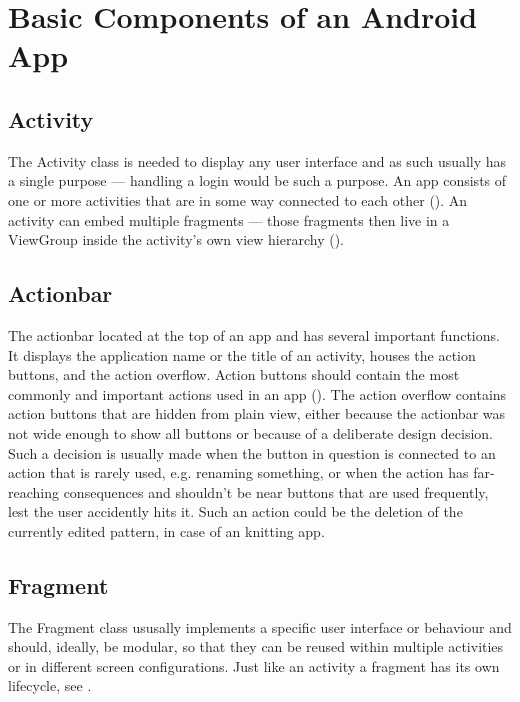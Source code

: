 \section{Basic Components of an Android App}

\subsection{Activity}
The Activity class is needed to display any user interface and as such usually has a single purpose --- handling a login would be such a purpose. An app consists of one or more activities that are in some way connected to each other (\cite{activities_in_app}). An activity can embed multiple fragments --- those fragments then live in a ViewGroup inside the activity's own view hierarchy (\cite{androidfragment}).  

\subsection{Actionbar}
The actionbar located at the top of an app and has several important functions. It displays the application name or the title of an activity, houses the action buttons, and the action overflow. Action buttons should contain the most commonly and important actions used in an app (\cite{actionbar}). The action overflow contains action buttons that are hidden from plain view, either because the actionbar was not wide enough to show all buttons or because of a deliberate design decision. Such a decision is usually made when the button in question is connected to an action that is rarely used, e.g. renaming something, or when the action has far-reaching consequences and shouldn't be near buttons that are used frequently, lest the user accidently hits it. Such an action could be the deletion of the currently edited pattern, in case of an knitting app. 

\subsection{Fragment}
The Fragment class ususally implements a specific user interface or behaviour and should, ideally, be modular, so that they can be reused within multiple activities or in different screen configurations. Just like an activity a fragment has its own lifecycle, see .

